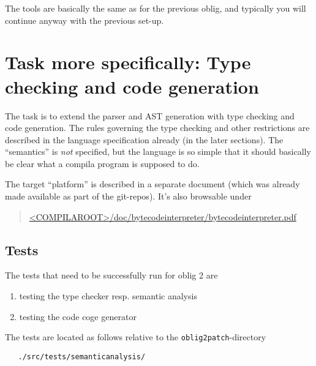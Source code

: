 \documentclass[11pt,freeform]{handout}[2014/08/13]
\begin{document}
The tools are basically the same as for the previous oblig, and typically
you will continue anyway with the previous set-up. 




\section{Task more specifically: Type checking and code generation}
\label{sec:task-more-spec}



The task is to extend the parser and AST generation with type checking and
code generation. The rules governing the type checking and other
restrictions are described in the language specification already (in the
later sections). The ``semantics'' is \emph{not} specified, but the
language is so simple that it should basically be clear what a compila
program is supposed to do.

The target ``platform'' is described in a separate document (which was
already made available as part of the git-repos). It's also browsable under


\begin{quote}
  \url{<COMPILAROOT>/doc/bytecodeinterpreter/bytecodeinterpreter.pdf}
\end{quote}






\subsection*{Tests}
\label{sec:tests}

The tests that need to be successfully run for oblig 2 are
\begin{enumerate}
\item testing the type checker resp. semantic analysis
\item testing the code coge generator
\end{enumerate}


The tests are located as follows relative to the
\texttt{oblig2patch}-directory

\begin{verbatim}
   ./src/tests/semanticanalysis/
\end{verbatim}
\end{document}
